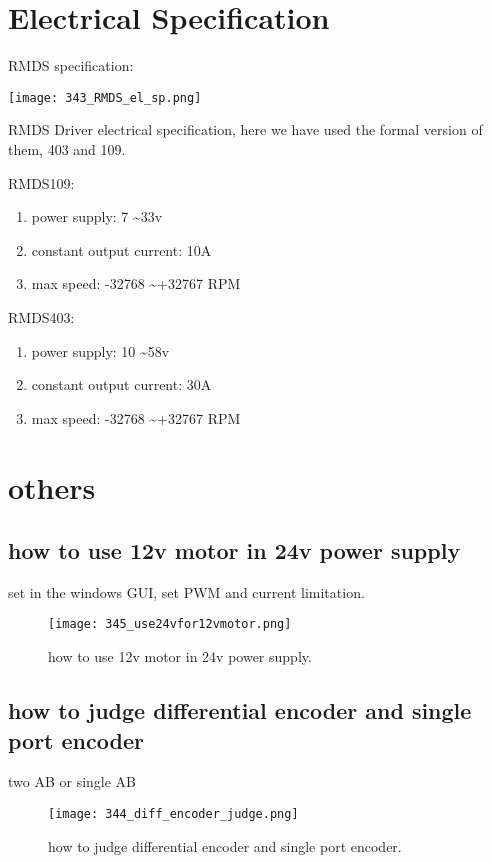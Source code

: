 \section{Electrical Specification}
RMDS specification:
\begin{marginfigure}[-3cm]
	\texttt{[image: 343\_RMDS\_el\_sp.png]}
	\caption[RMDS Driver electrical specification]{ 
		RMDS Driver electrical specification, here we have used the formal version of them, 403 and 109.		 
		}
\end{marginfigure}
RMDS109:
\begin{enumerate}
	\item power supply: 7 \textasciitilde 33v
	\item constant output current: 10A
	\item max speed: -32768 \textasciitilde +32767 RPM
\end{enumerate}

RMDS403:
\begin{enumerate}
	\item power supply: 10 \textasciitilde 58v
	\item constant output current: 30A
	\item max speed: -32768 \textasciitilde +32767 RPM
\end{enumerate}


\section{others}
\subsection{how to use 12v motor in 24v power supply }
set in the windows GUI, set PWM and current limitation.
\begin{figure}[!htb]
	\texttt{[image: 345\_use24vfor12vmotor.png]}
	\caption[how to use 12v motor in 24v power supply]{ 
		how to use 12v motor in 24v power supply.		 
		}
\end{figure}

\subsection{how to judge differential encoder and single port encoder }
two AB or single AB
\begin{figure}[!htb]
	\texttt{[image: 344\_diff\_encoder\_judge.png]}
	\caption[how to judge differential encoder and single port encoder]{ 
		how to judge differential encoder and single port encoder.		 
		}
\end{figure}

